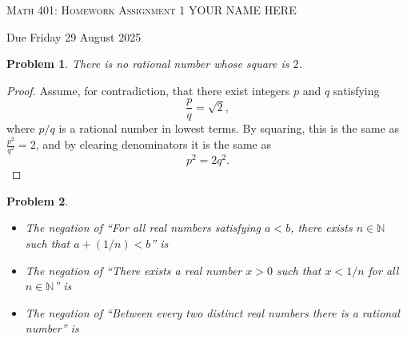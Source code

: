 \documentclass[12pt]{article}
\newtheorem{problem}{Problem}
\newcommand{\NN}{\ensuremath{\mathbb N}}
\begin{document}
\small
\noindent \textsc{Math 401: Homework Assignment 1} \hfill YOUR NAME HERE

\noindent \hfill Due Friday 29 August 2025
\normalsize
\bigskip

\setcounter{problem}{0} %


\begin{problem} %
There is no rational number whose square is $2$. \end{problem}


\begin{proof}
Assume, for contradiction, that there exist integers $p$ and $q$ satisfying
	$$\frac{p}{q} = \sqrt{2},$$
where $p/q$ is a rational number in lowest terms.  By squaring, this is the same as $\frac{p^2}{q^2} = 2$, and by clearing denominators it is the same as
	$$p^2 = 2 q^2.$$
\end{proof}


\begin{problem} %


\begin{itemize}
\item[(a)] The negation of ``For all real numbers satisfying $a<b$, there exists $n\in\NN$ such that $a+(1/n)<b$'' is

\item[(b)] The negation of ``There exists a real number $x>0$ such that $x<1/n$ for all $n\in\NN$'' is

\item[(b)] The negation of ``Between every two distinct real numbers there is a rational number'' is

\end{itemize}
\end{problem}
\end{document}
